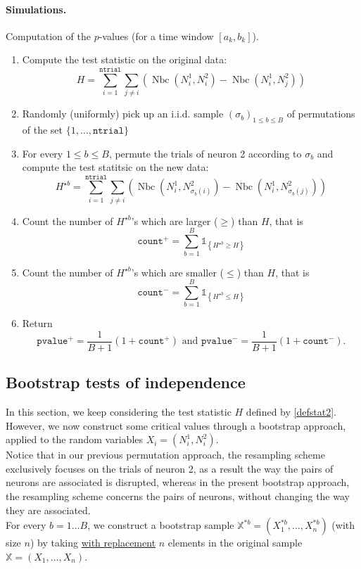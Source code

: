\documentclass[a4paper,oneside,10pt]{article}
\newcommand{\pa}[1]{\ensuremath{\left( #1 \right)}}
\newcommand{\Nbc}{\operatorname{Nbc}}
\newcommand{\X}{\ensuremath{\mathds{X}}}
\newcommand{\1}[1]{\ensuremath{\mathds{1}_{\left\{ #1 \right\}}}}  %
\begin{document}
\paragraph{Simulations.}
Computation of the $p$-values (for a time window $[a_k,b_k]$).
\begin{enumerate}
\item Compute the test statistic on the original data: 
$$H=\sum_{i=1}^{\texttt{ntrial}} \sum_{j\neq i}\left(\Nbc(N^1_i,N^2_{i})-\Nbc(N_i^1,N_j^2)\right)$$
\item Randomly (uniformly) pick up an i.i.d. sample $\pa{\sigma_b}_{1\leq b\leq B}$ of permutations of the set $\{1,\ldots,\texttt{ntrial}\}$
\item For every $1\leq b\leq B$, permute the trials of neuron 2 according to $\sigma_b$ and compute the test statitsic on the new data:
$$H^{\star b}=\sum_{i=1}^{\texttt{ntrial}} \sum_{j\neq i}\left(\Nbc(N^1_i,N^2_{\sigma_b(i)})-\Nbc(N_i^1,N_{\sigma_b(j)}^2)\right)$$
\item Count the number of $H^{\star b}$'s which are larger ($\geq$) than $H$, that is
$$\texttt{count}^+=\sum_{b=1}^B \1{H^{\star b}\geq H}$$
\item Count the number of $H^{\star b}$'s which are smaller ($\leq$) than $H$, that is
$$\texttt{count}^-=\sum_{b=1}^B \1{H^{\star b}\leq H}$$
\item Return $$\texttt{pvalue}^+=\frac{1}{B+1}\pa{1+\texttt{count}^+}\textrm{ and }\texttt{pvalue}^-=\frac{1}{B+1}\pa{1+\texttt{count}^-}.$$
\end{enumerate}

\subsection{Bootstrap tests of independence}

In this section, we keep considering the test statistic $H$ defined by \eqref{defstat2}. However, we now construct some critical values through a bootstrap approach, applied to the random variables $X_i=(N_i^1,N_i^2)$.\\

Notice that in our previous permutation approach, the resampling scheme exclusively focuses on the trials of neuron 2, as a result the way the pairs of neurons are associated is  disrupted, whereas in the present bootstrap approach, the resampling scheme concerns the pairs of neurons, without changing the way they are associated.\\

For every $b=1\ldots B$, we construct a bootstrap sample $\X^{* b}=(X_1^{* b},\ldots, X_n^{* b})$ (with size $n$) by taking \underline{with replacement} $n$ elements in the original sample $\X=(X_1,\ldots,X_n)$.
\end{document}
